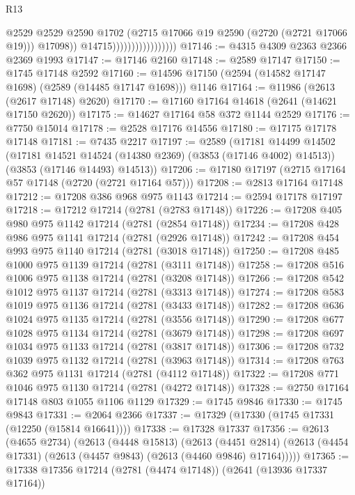 \begin{lexlean}{R13}
\begin{coremodule}
                                          @2529
                                          @2529
                                          @2590
                                          @1702
                                          (@2715 @17066 @19 @2590 (@2720 (@2721 @17066 @19)))
                                          @17098))
                                      @14715)))))))))))))))))
@17146 := @4315 @4309 @2363 @2366 @2369 @1993
@17147 := @17146 @2160
@17148 := @2589 @17147
@17150 := @1745 @17148 @2592
@17160 := @14596 @17150 (@2594 (@14582 @17147 @1698) (@2589 (@14485 @17147 @1698))) @1146
@17164 := @11986 (@2613 (@2617 @17148) @2620)
@17170 := @17160 @17164 @14618 (@2641 (@14621 @17150 @2620))
@17175 := @14627 @17164 @58 @372 @1144 @2529
@17176 := @7750 @15014
@17178 := @2528 @17176 @14556
@17180 := @17175 @17178 @17148
@17181 := @7435 @2217
@17197 := @2589
    (@17181
      @14499
      @14502
      (@17181 @14521 @14524 (@14380 @2369) (@3853 (@17146 @4002) @14513))
      (@3853 (@17146 @14493) @14513))
@17206 := @17180 @17197 (@2715 @17164 @57 @17148 (@2720 (@2721 @17164 @57)))
@17208 := @2813 @17164 @17148
@17212 := @17208 @386 @968 @975 @1143
@17214 := @2594 @17178 @17197
@17218 := @17212 @17214 (@2781 (@2783 @17148))
@17226 := @17208 @405 @980 @975 @1142 @17214 (@2781 (@2854 @17148))
@17234 := @17208 @428 @986 @975 @1141 @17214 (@2781 (@2926 @17148))
@17242 := @17208 @454 @993 @975 @1140 @17214 (@2781 (@3018 @17148))
@17250 := @17208 @485 @1000 @975 @1139 @17214 (@2781 (@3111 @17148))
@17258 := @17208 @516 @1006 @975 @1138 @17214 (@2781 (@3208 @17148))
@17266 := @17208 @542 @1012 @975 @1137 @17214 (@2781 (@3313 @17148))
@17274 := @17208 @583 @1019 @975 @1136 @17214 (@2781 (@3433 @17148))
@17282 := @17208 @636 @1024 @975 @1135 @17214 (@2781 (@3556 @17148))
@17290 := @17208 @677 @1028 @975 @1134 @17214 (@2781 (@3679 @17148))
@17298 := @17208 @697 @1034 @975 @1133 @17214 (@2781 (@3817 @17148))
@17306 := @17208 @732 @1039 @975 @1132 @17214 (@2781 (@3963 @17148))
@17314 := @17208 @763 @362 @975 @1131 @17214 (@2781 (@4112 @17148))
@17322 := @17208 @771 @1046 @975 @1130 @17214 (@2781 (@4272 @17148))
@17328 := @2750 @17164 @17148 @803 @1055 @1106 @1129
@17329 := @1745 @9846
@17330 := @1745 @9843
@17331 := @2064 @2366
@17337 := @17329 (@17330 (@1745 @17331 (@12250 (@15814 @16641))))
@17338 := @17328 @17337
@17356 := @2613
    (@4655 @2734)
    (@2613
      (@4448 @15813)
      (@2613
        (@4451 @2814)
        (@2613 (@4454 @17331) (@2613 (@4457 @9843) (@2613 (@4460 @9846) @17164)))))
@17365 := @17338 @17356 @17214 (@2781 (@4474 @17148)) (@2641 (@13936 @17337 @17164))

\end{coremodule}
\end{lexlean}
